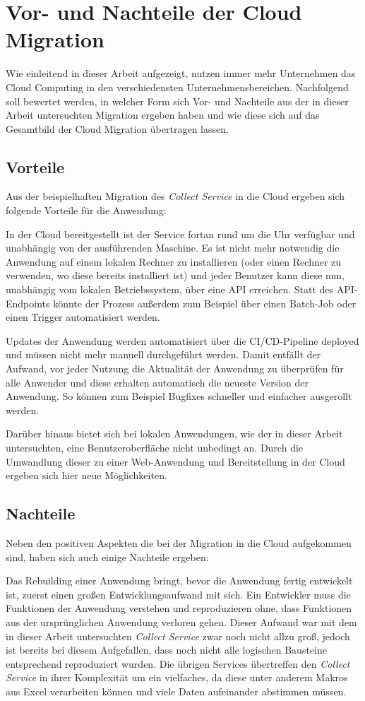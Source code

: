 \section{Vor- und Nachteile der Cloud Migration}
Wie einleitend in dieser Arbeit aufgezeigt, nutzen immer mehr Unternehmen das Cloud Computing in den verschiedensten Unternehmensbereichen. Nachfolgend soll bewertet werden, in welcher Form sich Vor- und Nachteile aus der in dieser Arbeit untersuchten Migration ergeben haben und wie diese sich auf das Gesamtbild der Cloud Migration übertragen lassen.

\subsection{Vorteile}
Aus der beispielhaften Migration des \textit{Collect Service} in die Cloud ergeben sich folgende Vorteile für die Anwendung:

In der Cloud bereitgestellt ist der Service fortan rund um die Uhr verfügbar und unabhängig von der ausführenden Maschine. Es ist nicht mehr notwendig die Anwendung auf einem lokalen Rechner zu installieren (oder einen Rechner zu verwenden, wo diese bereits installiert ist) und jeder Benutzer kann diese nun, unabhängig vom lokalen Betriebssystem, über eine \ac{API} erreichen. Statt des \ac{API}-Endpoints könnte der Prozess außerdem zum Beispiel über einen Batch-Job oder einen Trigger automatisiert werden.

Updates der Anwendung werden automatisiert über die \ac{CI/CD}-Pipeline deployed und müssen nicht mehr manuell durchgeführt werden. Damit entfällt der Aufwand, vor jeder Nutzung die Aktualität der Anwendung zu überprüfen für alle Anwender und diese erhalten automatisch die neueste Version der Anwendung. So können zum Beispiel Bugfixes schneller und einfacher ausgerollt werden. 

Darüber hinaus bietet sich bei lokalen Anwendungen, wie der in dieser Arbeit untersuchten, eine Benutzeroberfläche nicht unbedingt an. Durch die Umwandlung dieser zu einer Web-Anwendung und Bereitstellung in der Cloud ergeben sich hier neue Möglichkeiten.
\pagebreak

\subsection{Nachteile}
Neben den positiven Aspekten die bei der Migration in die Cloud aufgekommen sind, haben sich auch einige Nachteile ergeben:

Das Rebuilding einer Anwendung bringt, bevor die Anwendung fertig entwickelt ist, zuerst einen großen Entwicklungsaufwand mit sich. Ein Entwickler muss die Funktionen der Anwendung verstehen und reproduzieren ohne, dass Funktionen aus der ursprünglichen Anwendung verloren gehen. Dieser Aufwand war mit dem in dieser Arbeit untersuchten \textit{Collect Service} zwar noch nicht allzu groß, jedoch ist bereits bei diesem Aufgefallen, dass noch nicht alle logischen Bausteine entsprechend reproduziert wurden. Die übrigen Services übertreffen den \textit{Collect Service} in ihrer Komplexität um ein vielfaches, da diese unter anderem Makros aus Excel verarbeiten können und viele Daten aufeinander abstimmen müssen.

